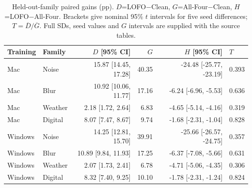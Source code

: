 \begin{table}[!htbp]
\centering
\small
\setlength{\tabcolsep}{5pt}
\caption{Held-out-family paired gains (pp). $D$=LOFO$-$Clean, $G$=All-Four$-$Clean, $H$=LOFO$-$All-Four. Brackets give nominal 95\% $t$ intervals for five seed differences; $T=\overline D/\overline G$. Full SDs, seed values and $G$ intervals are supplied with the source tables.}
\label{tab:transfer}
\begin{tabular}{llrrrl}
\toprule
Training & Family & $D$ [95\% CI] & $G$ & $H$ [95\% CI] & $T$ \\
\midrule
Mac & Noise & 15.87 [14.45, 17.28] & 40.35 & -24.48 [-25.77, -23.19] & 0.393 \\
Mac & Blur & 10.92 [10.06, 11.77] & 17.16 & -6.24 [-6.96, -5.53] & 0.636 \\
Mac & Weather & 2.18 [1.72, 2.64] & 6.83 & -4.65 [-5.14, -4.16] & 0.319 \\
Mac & Digital & 8.07 [7.47, 8.67] & 9.74 & -1.68 [-2.31, -1.04] & 0.828 \\
Windows & Noise & 14.25 [12.81, 15.70] & 39.91 & -25.66 [-26.57, -24.75] & 0.357 \\
Windows & Blur & 10.89 [9.84, 11.93] & 17.25 & -6.37 [-7.08, -5.66] & 0.631 \\
Windows & Weather & 2.07 [1.73, 2.41] & 6.78 & -4.71 [-5.06, -4.35] & 0.306 \\
Windows & Digital & 8.32 [7.40, 9.25] & 10.10 & -1.78 [-2.31, -1.24] & 0.824 \\
\bottomrule
\end{tabular}
\end{table}
